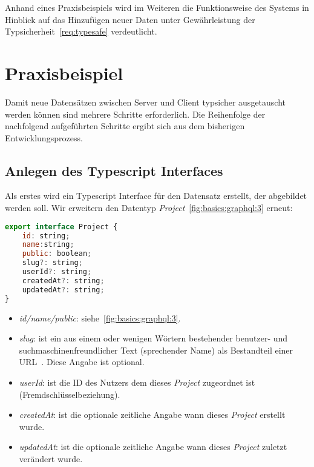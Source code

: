 Anhand eines Praxisbeispiels wird im Weiteren die Funktionsweise des Systems in Hinblick auf das Hinzufügen neuer Daten
unter Gewährleistung der Typsicherheit~\ref{req:typesafe} verdeutlicht.

\section{Praxisbeispiel}
\label{sec:requirements:example}

Damit neue Datensätzen zwischen Server und Client typsicher ausgetauscht werden können sind mehrere Schritte erforderlich.
Die Reihenfolge der nachfolgend aufgeführten Schritte ergibt sich aus dem bisherigen Entwicklungsprozess.

\subsection{Anlegen des Typescript Interfaces}
\label{sec:requirements:example:interface}

Als erstes wird ein Typescript Interface für den Datensatz erstellt, der abgebildet werden soll.
Wir erweitern den Datentyp \emph{Project}~\ref{fig:basics:graphql:3} erneut:

\begin{lstlisting}[language=JavaScript,float=h!,caption={Typescript Interface für die Darstellung eines Projektes}, label={lst:example:projectdesc}]
export interface Project {
    id: string;
    name:string;
    public: boolean;
    slug?: string;
    userId?: string;
    createdAt?: string;
    updatedAt?: string;
}
\end{lstlisting}

\begin{itemize}
    \setlength\itemsep{-1em}
    \item \emph{id/name/public}: siehe~\ref{fig:basics:graphql:3}.
    \item \emph{slug}: ist ein aus einem oder wenigen Wörtern bestehender benutzer- und suchmaschinenfreundlicher
    Text (sprechender Name) als Bestandteil einer URL~\cite{slug-wikipedia}. Diese Angabe ist optional.
    \item \emph{userId}: ist die ID des Nutzers dem dieses \emph{Project} zugeordnet ist (Fremdschlüsselbeziehung).
    \item \emph{createdAt}: ist die optionale zeitliche Angabe wann dieses \emph{Project} erstellt wurde.
    \item \emph{updatedAt}: ist die optionale zeitliche Angabe wann dieses \emph{Project} zuletzt verändert wurde.
\end{itemize}


